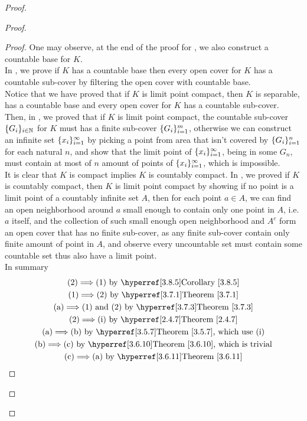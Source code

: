 \documentclass{report}
\begin{document}
\begin{proof}
\begin{proof}
\begin{proof}
One may observe, at the end of the proof for , we also construct a countable base for $K$.\\

In  , we prove if  $K$ has a countable base then every open cover for  $K$ has a countable sub-cover by filtering the open cover with countable base.\\

Notice that we have proved that if $K$ is limit point compact, then  $K$ is separable, has a countable base and every open cover for  $K$ has a countable sub-cover.\\

Then, in , we proved that if $K$ is limit point compact, the countable sub-cover $\{ G_i \}_{i\in\mathbb{N}}$ for $K$ must has a finite sub-cover $\{ G_i \}_{i=1}^m$, otherwise we can construct an infinite set $\{ x_i \}_{i=1}^\infty$ by picking a point from area that isn't covered by $\{ G_i \}_{i=1}^n$ for each natural $n$, and show that the limit point of $\{ x_i \}_{i=1}^\infty$, being in some $G_n$, must contain at most of  $n$ amount of points of  $\{ x_i \}_{i=1}^\infty$, which is impossible.\\

It is clear that $K$ is compact implies $K$ is countably compact. In  , we proved if $K$ is countably compact, then $K$ is limit point compact by showing if no point is a limit point of a countably infinite set $A$, then for each point $a\in A$, we can find an open neighborhood around $a$ small enough to contain only one point in $A$, i.e.  $a$ itself, and the collection of such small enough open neighborhood and  $A^c$ form an open cover that has no finite sub-cover, as any finite sub-cover contain only finite amount of point in  $A$, and observe every uncountable set must contain some countable set thus also have a limit point.\\

In summary 
\begin{gather}
\text{(2)$\implies $(1) by \myref{Corollary}{3.8.5}}\\
\text{(1)$\implies $(2) by \myref{Theorem}{3.7.1}}\\
\text{(a)$\implies $(1) and (2) by \myref{Theorem}{3.7.3}}\\
\text{(2)$\implies $(i) by \myref{Theorem}{2.4.7}}\\
\text{(a)$\implies $(b) by \myref{Theorem}{3.5.7}, which use  (i)}\\
\text{(b)$\implies$(c) by \myref{Theorem}{3.6.10}, which is trivial}\\
\text{(c)$\implies $(a) by \myref{Theorem}{3.6.11}}
\end{gather}
\end{proof}

\end{proof}
\end{proof}
\end{document}
